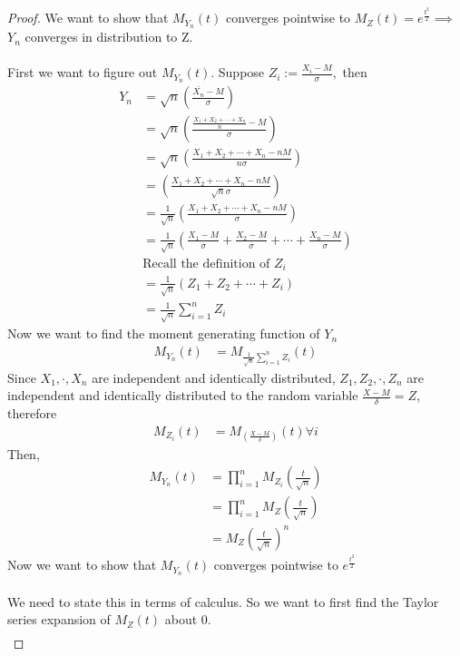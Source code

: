 \documentclass[11pt,oneside]{book}
\theoremstyle{break}
\theoremstyle{break}
\begin{document}
\begin{proof}
We want to show that $M_{Y_n}(t)$ converges pointwise to $M_{Z}(t)=e^{\frac{t^2}{2}} \implies$ $Y_n$ converges in distribution to Z. \\
\hfill\\
First we want to figure out $M_{Y_n}(t)$. Suppose $Z_i:=\frac{X_i-M}{\sigma},$ then\begin{align*}
Y_n&=\sqrt{n}\left(\frac{\bar{X_n}-M}{\sigma} \right)\\
&=\sqrt{n}\left( \frac{\frac{X_1+X_2+\cdots+X_n}{n}-M}{\sigma}\right)\\
&=\sqrt{n}\left( \frac{X_1+X_2+\cdots +X_n-nM}{n\sigma}\right)\\
&=\left( \frac{X_1+X_2+\cdots +X_n-nM}{\sqrt{n}\sigma}\right)\\
&=\frac{1}{\sqrt{n}}\left(  \frac{X_1+X_2+\cdots +X_n-nM}{\sigma}\right)\\
&=\frac{1}{\sqrt{n}}\left(\frac{X_1-M}{\sigma}+\frac{X_2-M}{\sigma}+\cdots +\frac{X_n-M}{\sigma} \right)\\
&\text{Recall the definition of }Z_i\\
&=\frac{1}{\sqrt{n}}\left(Z_1+Z_2+\cdots+Z_i\right)\\
&=\frac{1}{\sqrt{n}}\sum_{i=1}^{n}Z_i
\end{align*}
Now we want to find the moment generating function of $Y_n$\begin{align*}
M_{Y_n}(t)&=M_{\frac{1}{\sqrt{n}}\sum_{i=1}^{n}Z_i}(t)
\end{align*}
Since $X_1,\cdot,X_n$ are independent and identically distributed, $Z_1,Z_2,\cdot,Z_n$ are independent and identically distributed to the random variable $\frac{X-M}{\delta}=Z$, therefore \begin{align*}
M_{Z_i}(t)&=M_{\left(\frac{X-M}{\delta}\right)}(t) \forall i
\end{align*}
Then, \begin{align*}
M_{Y_n}(t)&=\prod_{i=1}^{n}M_{Z_i}\left(\frac{t}{\sqrt{n}} \right)\\
&=\prod_{i=1}^nM_{Z}\left(\frac{t}{\sqrt{n}}\right)\\
&=M_{Z}\left(\frac{t}{\sqrt{n}}\right)^n
\end{align*}
Now we want to show that $M_{Y_n}(t)$ converges pointwise to $e^{\frac{t^2}{2}}$\\
\hfill\\
We need to state this in terms of calculus. So we want to first find the Taylor series expansion of $M_Z(t)$ about 0.\begin{align*}

\end{align*}
\end{proof}
\end{document}
